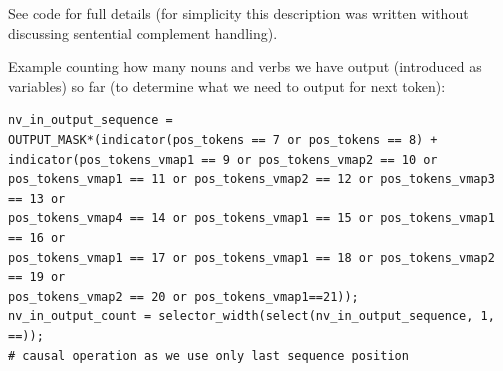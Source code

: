 \documentclass[11pt]{article}
\begin{document}
See code for full details (for simplicity this description was written without discussing sentential complement handling).

Example counting how many nouns and verbs we have output (introduced as variables) so far (to determine what we need to output for next token):
\begin{tiny}
\begin{verbatim}
nv_in_output_sequence = 
OUTPUT_MASK*(indicator(pos_tokens == 7 or pos_tokens == 8) + 
indicator(pos_tokens_vmap1 == 9 or pos_tokens_vmap2 == 10 or 
pos_tokens_vmap1 == 11 or pos_tokens_vmap2 == 12 or pos_tokens_vmap3 == 13 or 
pos_tokens_vmap4 == 14 or pos_tokens_vmap1 == 15 or pos_tokens_vmap1 == 16 or 
pos_tokens_vmap1 == 17 or pos_tokens_vmap1 == 18 or pos_tokens_vmap2 == 19 or 
pos_tokens_vmap2 == 20 or pos_tokens_vmap1==21));
nv_in_output_count = selector_width(select(nv_in_output_sequence, 1, ==)); 
# causal operation as we use only last sequence position
\end{verbatim}
\end{tiny}
\end{document}
